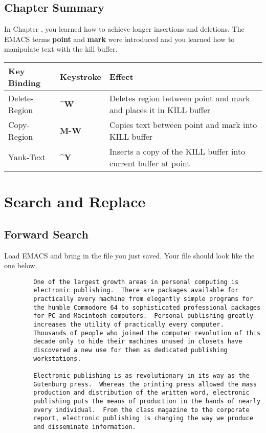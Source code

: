 \section{Chapter \thechapter{} Summary}

In Chapter \thechapter{}, you learned how to achieve longer insertions
and deletions.  The EMACS terms {\bf{}point} and {\bf{}mark} were introduced
and you learned how to manipulate text with the kill buffer.

\begin{tabular}{llp{4in}}
Key Binding & Keystroke & Effect \\ \hline

Delete-Region & {\bf{}\^{}W} & Deletes region between point and mark
and places it in KILL buffer \\

Copy-Region & {\bf{}M-W} & Copies text between point and mark into
KILL buffer \\

Yank-Text & {\bf{}\^{}Y} & Inserts a copy of the KILL buffer into
current buffer at point \\

\end{tabular}

\chapter{Search and Replace}

\section{Forward Search}

Load EMACS and bring in the file you just saved.  Your file should look
like the one below.

\begin{verbatim}
        One of the largest growth areas in personal computing is
        electronic publishing.  There are packages available for
        practically every machine from elegantly simple programs for
        the humble Commodore 64 to sophisticated professional packages
        for PC and Macintosh computers.  Personal publishing greatly
        increases the utility of practically every computer.
        Thousands of people who joined the computer revolution of this
        decade only to hide their machines unused in closets have
        discovered a new use for them as dedicated publishing
        workstations.

        Electronic publishing is as revolutionary in its way as the
        Gutenburg press.  Whereas the printing press allowed the mass
        production and distribution of the written word, electronic
        publishing puts the means of production in the hands of nearly
        every individual.  From the class magazine to the corporate
        report, electronic publishing is changing the way we produce
        and disseminate information.
\end{verbatim}

